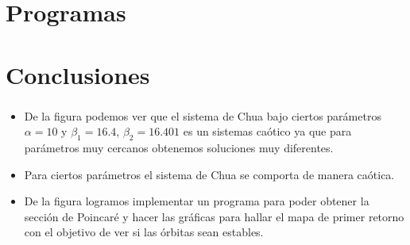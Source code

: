 \section{Programas}


\section{Conclusiones}

\begin{frame}
	\frametitle{\secname}
	\begin{itemize}
		\item De la figura podemos ver que el sistema de Chua bajo ciertos parámetros $\alpha= 10$  y $\beta_{1}=16.4$, $\beta_{2}=16.401$ es un sistemas caótico ya que para parámetros muy cercanos obtenemos soluciones muy diferentes.
		\item Para ciertos parámetros el sistema de Chua se comporta de manera caótica.
		\item De la figura logramos implementar un programa para poder obtener la sección de Poincaré y hacer las gráficas para hallar el mapa de primer retorno con el objetivo de ver si las órbitas sean estables. %
	\end{itemize}
\end{frame}
